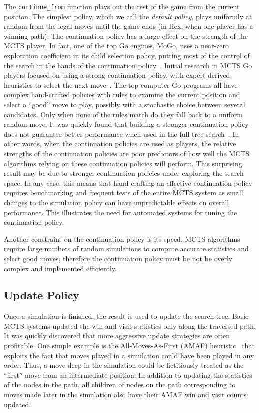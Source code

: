 \documentclass{acm_proc_article-sp}
\begin{document}
The \verb+continue_from+ function plays out the rest of the game from the current position. 
The simplest policy, which we call the \emph{default policy},
 plays uniformly at random from the legal moves until the game ends (in Hex, when one player has a winning path). 
The continuation policy has a large effect on the strength of the MCTS player.
In fact, one of the top Go engines, MoGo, uses a near-zero exploration coefficient in its child selection policy,
putting most of the control of the search in the hands of the continuation policy~\cite{gelly2007combining}.
Initial research in MCTS Go players focused on using a strong continuation policy, with expert-derived heuristics to select the next move~\cite{chaslot2010adding}. 
The top computer Go programs all have complex hand-crafted policies with rules to examine the current position and select a ``good'' move to play, possibly with a stochastic choice between several candidates. 
Only when none of the rules match do they fall back to a uniform random move. 
It was quickly found that building a stronger continuation policy does not guarantee better performance when used in the full tree search~\cite{gelly2006modification}. 
In other words, when the continuation policies are used as players, the relative strengths of the continuation policies are poor predictors
of how well the MCTS algorithms relying on these continuation policies will perform.
This surprising result may be due to stronger continuation policies under-exploring the search space.
In any case, this means that hand crafting an effective continuation policy requires benchmarking and frequent tests of the entire
MCTS system as small changes to the simulation policy can have unpredictable effects on overall performance.
This illustrates the need for automated systems for tuning the continuation policy.

Another constraint on the continuation policy is its speed.  
MCTS algorithms require large numbers of random simulations to compute accurate statistics and select good moves, therefore the continuation policy must be not be overly complex and implemented efficiently.

\subsection{Update Policy}
Once a simulation is finished, the result is used to update the search tree.
Basic MCTS systems updated the win and visit statistics only along the traversed path.
It was quickly discovered that more aggressive update strategies are often profitable.
One simple example is the All-Moves-As-First (AMAF) heuristic~\cite{brugmann1993monte}
that exploits the fact that moves played in a simulation could have been played in any order. 
Thus, a move deep in the simulation could be fictitiously treated as the ``first'' move from an intermediate position. 
In addition to updating the statistics of the nodes in the path, all children of nodes on the path corresponding to moves made later
in the simulation also have their AMAF win and visit counts updated. 
\end{document}
